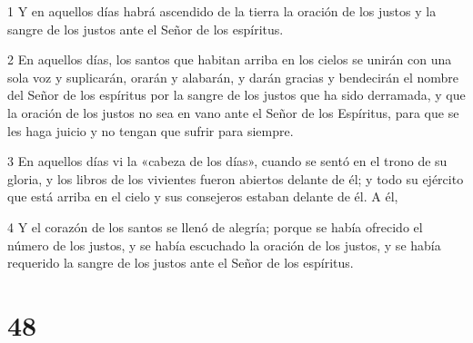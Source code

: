 \par 1 Y en aquellos días habrá ascendido de la tierra la oración de los justos y la sangre de los justos ante el Señor de los espíritus.
\par 2 En aquellos días, los santos que habitan arriba en los cielos se unirán con una sola voz y suplicarán, orarán y alabarán, y darán gracias y bendecirán el nombre del Señor de los espíritus por la sangre de los justos que ha sido derramada, y que la oración de los justos no sea en vano ante el Señor de los Espíritus, para que se les haga juicio y no tengan que sufrir para siempre.
\par 3 En aquellos días vi la «cabeza de los días», cuando se sentó en el trono de su gloria, y los libros de los vivientes fueron abiertos delante de él; y todo su ejército que está arriba en el cielo y sus consejeros estaban delante de él. A él,
\par 4 Y el corazón de los santos se llenó de alegría; porque se había ofrecido el número de los justos, y se había escuchado la oración de los justos, y se había requerido la sangre de los justos ante el Señor de los espíritus.

\chapter{48}

